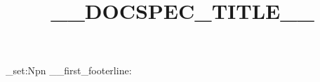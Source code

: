 \let\WriteBookmarks\relax
\def\floatpagefraction{.9}


\ExplSyntaxOn
\cs_set:Npn \__first_footerline: { }
\ExplSyntaxOff

\RenewDocumentCommand{\printorcid}{}{}

\renewcommand{\printnonumnotes}{}


\title[mode=title,align=\centering]{__DOCSPEC_TITLE__}

